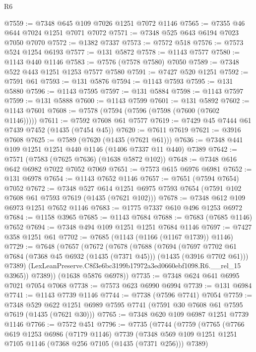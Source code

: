 \begin{lexlean}{R6}
\begin{coremodule}
@7559 := @7348 @645 @109 @7026 @1251 @7072 @1146
@7565 := @7355 @46 @644 @7024 @1251 @7071 @7072
@7571 := @7348 @525 @643 @6194 @7023 @7050 @7070
@7572 := @1382 @7337
@7573 := @7572 @518
@7576 := @7573 @524 @1254 @6193
@7577 := @131 @5872
@7578 := @1143 @7577
@7580 := @1143 @440 @1146
@7583 := @7576 (@7578 @7580) @7050
@7589 := @7348 @522 @443 @1251 @1253 @7577 @7580
@7591 := @7427 @520 @1251
@7592 := @7591 @61
@7593 := @131 @5876
@7594 := @1143 @7593
@7595 := @131 @5880
@7596 := @1143 @7595
@7597 := @131 @5884
@7598 := @1143 @7597
@7599 := @131 @5888
@7600 := @1143 @7599
@7601 := @131 @5892
@7602 := @1143 @7601
@7608 := @7578 (@7594 (@7596 (@7598 (@7600 (@7602 @1146)))))
@7611 := @7592 @7608 @61 @7577
@7619 := @7429 @45 @7444 @61 @7439 @7452 (@1435 (@7454 @45))
@7620 := @7611 @7619
@7621 := @3916 @7608
@7625 := @7589 (@7620 (@1435 (@7621 @61)))
@7636 := @7348 @441 @109 @1251 @1251 @440 @1146 (@1406 @7337 @11 @440) @7389
@7642 := @7571 (@7583 (@7625 @7636) (@1638 @5872 @102))
@7648 := @7348 @616 @642 @6982 @7022 @7052 @7069
@7651 := @7573 @615 @6976 @6981
@7652 := @131 @6978
@7654 := @1143 @7652 @1146
@7657 := @7651 (@7594 @7654) @7052
@7672 := @7348
    @527
    @614
    @1251
    @6975
    @7593
    @7654
    (@7591 @102 @7608 @61 @7593 @7619 (@1435 (@7621 @102)))
@7678 := @7348 @612 @109 @6973 @1251 @7652 @1146
@7683 := @1775 @7337 @610 @496 @1253 @6972
@7684 := @1158 @3965
@7685 := @1143 @7684
@7688 := @7683 (@7685 @1146) @7652
@7694 := @7348 @494 @109 @1251 @1251 @7684 @1146
@7697 := @7427 @358 @1251 @61
@7702 := @7685 (@1143 (@1166 (@1167 @1739)) @1146)
@7729 := @7648
    (@7657
      (@7672
        (@7678
          (@7688
            (@7694
              (@7697
                @7702
                @61
                @7684
                (@7368 @45 @6932 (@1435 (@7371 @45)))
                (@1435 (@3916 @7702 @61)))
              @7389)
            (LexLeanPreserve.C8f3e6bc3199b17972a3ed0660ebf1098.R6.__rel_15 @3965))
          @7389))
      (@1638 @5876 @6978))
@7735 := @7348 @624 @641 @6995 @7021 @7054 @7068
@7738 := @7573 @623 @6990 @6994
@7739 := @131 @6984
@7741 := @1143 @7739 @1146
@7744 := @7738 (@7596 @7741) @7054
@7759 := @7348
    @529
    @622
    @1251
    @6989
    @7595
    @7741
    (@7591 @30 @7608 @61 @7595 @7619 (@1435 (@7621 @30)))
@7765 := @7348 @620 @109 @6987 @1251 @7739 @1146
@7766 := @7572 @451
@7796 := @7735
    (@7744
      (@7759
        (@7765
          (@7766
            @619
            @1253
            @6986
            (@7179 @1146)
            @7739
            (@7348 @569 @109 @1251 @1251 @7105 @1146 (@7368 @256 @7105 (@1435 (@7371 @256))) @7389)

\end{coremodule}
\end{lexlean}
